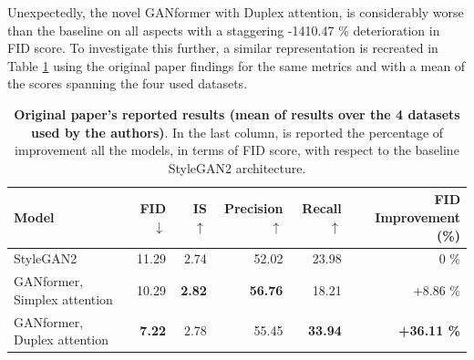 \documentclass{article}
\begin{document}
	Unexpectedly, the novel GANformer with Duplex attention, is considerably worse than the baseline 
	on all aspects with a staggering -1410.47 \% deterioration in FID score.
	To investigate this further, a similar representation is recreated in Table \ref{tab:orig-results} using 
	the original paper findings for the same metrics and with a mean of the scores spanning the four 
	used datasets.
	\begin{table}[htb]
		\centering
		\caption{\textbf{Original paper's reported results (mean of results over the 4 datasets used by the 
				authors)}. In the last column, is reported the percentage of improvement all the models, in 
				terms 
			of FID score, with respect to the baseline StyleGAN2 architecture.}
		\label{tab:orig-results}
		\vspace{3mm}
		\small
		\begin{tabular}{l|rrrrr}
			\toprule
			\textbf{Model}  & \textbf{FID $\downarrow$}  & \textbf{IS $\uparrow$} & 
			\textbf{Precision$\uparrow$}  & \textbf{Recall $\uparrow$} & \textbf{FID Improvement (\%)}\\ 
			\midrule
			StyleGAN2                    & 11.29 & 2.74 & 52.02      & 23.98 & 0 \% \\ 
			{GANformer, Simplex attention} & 10.29 & \textbf{2.82}   & \textbf{56.76}     & 18.21  & 
			+8.86 \% \\ 
			{GANformer, Duplex attention}  & \textbf{7.22}   & 2.78 & 55.45     & \textbf{33.94} & 
			\textbf{+36.11 \%} 
			\\ 
			\bottomrule
		\end{tabular}
	\end{table}
	
\end{document}
